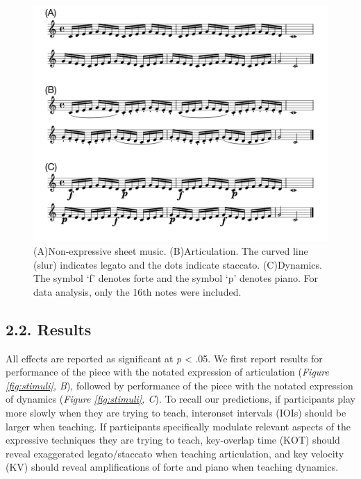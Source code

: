 \documentclass[
  english,
  man,floatsintext]{apa6}
\begin{document}
\begin{figure}
\includegraphics[width=1\linewidth]{manuscript_files/figure-latex/stim-1-1} \caption{\label{fig:stimuli}(A)Non-expressive sheet music. (B)Articulation. The curved line (slur) indicates legato and the dots indicate staccato. (C)Dynamics. The symbol `f' denotes forte and the symbol `p' denotes piano. For data analysis, only the 16th notes were included.}\label{fig:stim-1}
\end{figure}

\newpage

\hypertarget{results}{%
\subsection{2.2. Results}\label{results}}

All effects are reported as significant at \emph{p} \textless{} .05. We first report results for performance of the piece with the notated expression of articulation (\emph{Figure \ref{fig:stimuli}, B}), followed by performance of the piece with the notated expression of dynamics (\emph{Figure \ref{fig:stimuli}, C}). To recall our predictions, if participants play more slowly when they are trying to teach, interonset intervals (IOIs) should be larger when teaching. If participants specifically modulate relevant aspects of the expressive techniques they are trying to teach, key-overlap time (KOT) should reveal exaggerated legato/staccato when teaching articulation, and key velocity (KV) should reveal amplifications of forte and piano when teaching dynamics.
\end{document}
